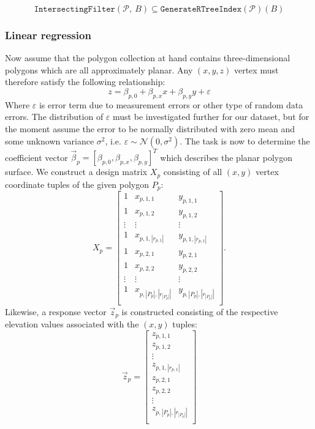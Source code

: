 \begin{equation*}
  \texttt{IntersectingFilter}(\mathcal{P},~B)
  \subseteq
  \texttt{GenerateRTreeIndex}(\mathcal{P})(B)
\end{equation*}

\subsubsection{Linear regression}

Now assume that the polygon collection at hand contains three-dimensional polygons which are all approximately planar.
Any $(x, y, z)$ vertex must therefore satisfy the following relationship:
%
\begin{equation*}
  z = \beta_{p,0} + \beta_{p,x} x + \beta_{p,y} y + \varepsilon
\end{equation*}
%
Where $\varepsilon$ is error term due to measurement errors or other type of random data errors.
The distribution of $\varepsilon$ must be investigated further for our dataset, but for the moment assume the error to be normally distributed with zero mean and some unknown variance $\sigma^2$, i.e. $\varepsilon \sim \mathcal{N}(0, \sigma^2)$.
%
The task is now to determine the coefficient vector $\vec{\beta}_p = {[\beta_{p,0}, \beta_{p,x}, \beta_{p,y}]}^T$ which describes the planar polygon surface.
We construct a design matrix $X_p$ consisting of all $(x, y)$ vertex coordinate tuples of the given polygon $P_p$:
%
\begin{equation*}
  X_p
  =
  \begin{bmatrix}
    1 & x_{p,1,1} & y_{p,1,1} \\
    1 & x_{p,1,2} & y_{p,1,2} \\
    \vdots & \vdots & \vdots \\
    1 & x_{p,1,|r_{p,1}|} & y_{p,1,|r_{p,1}|} \\
    1 & x_{p,2,1} & y_{p,2,1} \\
    1 & x_{p,2,2} & y_{p,2,2} \\
    \vdots & \vdots & \vdots \\
    1 & x_{p,|P_p|,|r_{|P_p|}|} & y_{p,|P_p|,|r_{|P_p|}|} \\
  \end{bmatrix}.
\end{equation*}
%
Likewise, a response vector $\vec{z}_p$ is constructed consisting of the respective elevation values associated with the $(x, y)$ tuples:
%
\begin{equation*}
  \vec{z}_p
  =
  \begin{bmatrix}
     z_{p,1,1} \\
     z_{p,1,2} \\
     \vdots \\
     z_{p,1,|r_{p,1}|} \\
     z_{p,2,1} \\
     z_{p,2,2} \\
     \vdots \\
     z_{p,|P_p|,|r_{|P_p|}|} \\
  \end{bmatrix}
\end{equation*}
